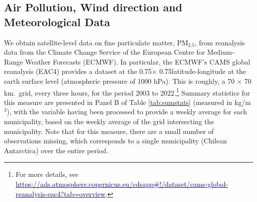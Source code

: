 \documentclass[11pt]{article}
\begin{document}
\begin{spacing}{1.5}
\subsection{Air Pollution, Wind direction and Meteorological Data}
\label{sscn:wind}
We obtain satellite-level data on fine particulate matter, PM$_{2.5}$, from reanalysis data from the Climate Change Service of the European Centre for Medium-Range Weather Forecasts (ECMWF). In particular, the ECMWF's CAMS global reanalysis (EAC4) provides a dataset at the 0.75\textdegree $\times$ 0.75\textdegree latitude-longitude at the earth surface level (atmospheric pressure of 1000 hPa). This is roughly, a 70 $\times$ 70 km.\ grid, every three hours, for the period 2003 to 2022.\footnote{For more details, see \hyperlink{https://ads.atmosphere.copernicus.eu/cdsapp\#!/dataset/cams-global-reanalysis-eac4?tab=overview}{\textcolor{blue}{https://ads.atmosphere.copernicus.eu/cdsapp\#!/dataset/cams-global-reanalysis-eac4?tab=overview}}.}  Summary statistics for this measure are presented in Panel B of Table \ref{tab:sumstats} (measured in kg/m$^3$), with the variable having been processed to provide a weekly average for each municipality, based on the weekly average of the grid intersecting the municipality.  Note that for this measure, there are a small number of observations missing, which corresponds to a single municipality (Chilean Antarctica) over the entire period.



\end{spacing}
\end{document}
